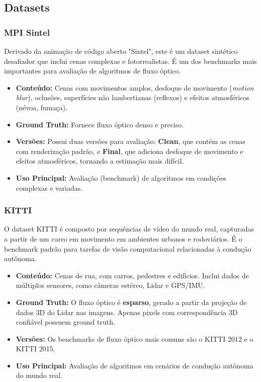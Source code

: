 \documentclass[12pt, a4paper]{article}
\begin{document}
\subsection{Datasets}

\subsubsection{MPI Sintel}
Derivado da animação de código aberto "Sintel", este é um dataset sintético desafiador que inclui cenas complexas e fotorrealistas. É um dos benchmarks mais importantes para avaliação de algoritmos de fluxo óptico.
\begin{itemize}
    \item \textbf{Conteúdo:} Cenas com movimentos amplos, desfoque de movimento (\textit{motion blur}), oclusões, superfícies não lambertianas (reflexos) e efeitos atmosféricos (névoa, fumaça).
    \item \textbf{Ground Truth:} Fornece fluxo óptico denso e preciso.
    \item \textbf{Versões:} Possui duas versões para avaliação: \textbf{Clean}, que contém as cenas com renderização padrão, e \textbf{Final}, que adiciona desfoque de movimento e efeitos atmosféricos, tornando a estimação mais difícil.
    \item \textbf{Uso Principal:} Avaliação (benchmark) de algoritmos em condições complexas e variadas.
\end{itemize}

\subsubsection{KITTI}
O dataset KITTI é composto por sequências de vídeo do mundo real, capturadas a partir de um carro em movimento em ambientes urbanos e rodoviários. É o benchmark padrão para tarefas de visão computacional relacionadas à condução autônoma.
\begin{itemize}
    \item \textbf{Conteúdo:} Cenas de rua, com carros, pedestres e edifícios. Inclui dados de múltiplos sensores, como câmeras estéreo, Lidar e GPS/IMU.
    \item \textbf{Ground Truth:} O fluxo óptico é \textbf{esparso}, gerado a partir da projeção de dados 3D do Lidar nas imagens. Apenas pixels com correspondência 3D confiável possuem ground truth.
    \item \textbf{Versões:} Os benchmarks de fluxo óptico mais comuns são o KITTI 2012 e o KITTI 2015.
    \item \textbf{Uso Principal:} Avaliação de algoritmos em cenários de condução autônoma do mundo real.
\end{itemize}
\end{document}

